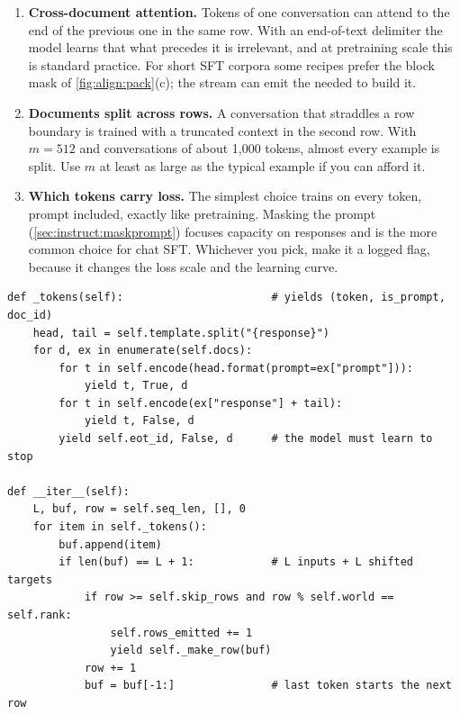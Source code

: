 \begin{enumerate}
  \item \textbf{Cross-document attention.} Tokens of one conversation can attend to the end of
        the previous one in the same row. With an end-of-text delimiter the model learns that
        what precedes it is irrelevant, and at pretraining scale this is standard practice. For
        short SFT corpora some recipes prefer the block mask of \cref{fig:align:pack}(c); the
        stream can emit the  needed to build it.
  \item \textbf{Documents split across rows.} A conversation that straddles a row boundary is
        trained with a truncated context in the second row. With $m=512$ and conversations of
        about 1{,}000 tokens, almost every example is split. Use $m$ at least as large as the
        typical example if you can afford it.
  \item \textbf{Which tokens carry loss.} The simplest choice trains on every token, prompt included,
        exactly like pretraining. Masking the prompt (\cref{sec:instruct:maskprompt}) focuses
        capacity on responses and is the more common choice for chat SFT. Whichever you pick,
        make it a logged flag, because it changes the loss scale and the learning curve.
\end{enumerate}

\begin{lstlisting}[caption={The streaming packer's core loop (\code{llmsys.alignment.PackedSFTStream}).},label={lst:align:stream}]
def _tokens(self):                       # yields (token, is_prompt, doc_id)
    head, tail = self.template.split("{response}")
    for d, ex in enumerate(self.docs):
        for t in self.encode(head.format(prompt=ex["prompt"])):
            yield t, True, d
        for t in self.encode(ex["response"] + tail):
            yield t, False, d
        yield self.eot_id, False, d      # the model must learn to stop

def __iter__(self):
    L, buf, row = self.seq_len, [], 0
    for item in self._tokens():
        buf.append(item)
        if len(buf) == L + 1:            # L inputs + L shifted targets
            if row >= self.skip_rows and row % self.world == self.rank:
                self.rows_emitted += 1
                yield self._make_row(buf)
            row += 1
            buf = buf[-1:]               # last token starts the next row
\end{lstlisting}

